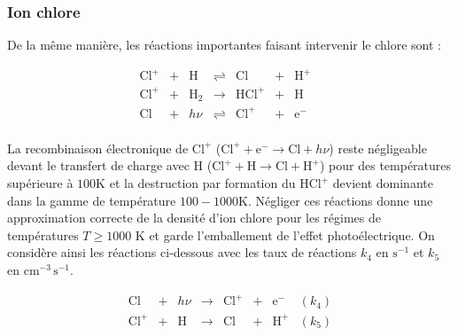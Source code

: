 


\subsubsection{Ion chlore}

De la même manière, les réactions importantes faisant intervenir le chlore sont :

\begin{equation}\label{eq:sysCl}
    \begin{array}{lllllllr}
        \mathrm{Cl}^+ & + &\mathrm{H}   & \rightleftharpoons &\mathrm{Cl}  & + & \mathrm{H}^+ &   \\
        \mathrm{Cl}^+ & + &\mathrm{H_2}   & \rightarrow & \mathrm{HCl}^+ & + &  \mathrm{H}&  \\
       \mathrm{Cl}  & + & h\nu & \rightleftharpoons & \mathrm{Cl}^+ & + & \mathrm{e}^- &  \\
    \end{array}
\end{equation}


La recombinaison électronique de $\mathrm{Cl}^+$ ($\mathrm{Cl}^+ + \mathrm{e}^-\rightarrow  \mathrm{Cl} + h\nu $) reste négligeable devant le transfert de charge avec $\mathrm{H}$  ($\mathrm{Cl}^+ + \mathrm{H} \rightarrow \mathrm{Cl}+ \mathrm{H}^+ $) pour des températures supérieure à $100$K et la destruction par formation du $\mathrm{HCl}^+$ devient dominante dans la gamme de température $100-1000$K. Négliger ces réactions donne une approximation correcte de la densité d'ion chlore pour les régimes de températures $T\geq 1000$ K et garde l'emballement de l'effet photoélectrique. On considère ainsi les réactions ci-dessous avec les taux de réactions $k_4$ en $\mathrm{s}^{-1}$ et $k_5$ en $\mathrm{cm}^{-3}\,\mathrm{s}^{-1}$.

\begin{equation}
    \begin{array}{lccccclr}
       \mathrm{Cl}  & + & h\nu & \rightarrow & \mathrm{Cl}^+ & + & \mathrm{e}^- & (k_4) \\
        \mathrm{Cl}^+ & + &\mathrm{H}   & \rightarrow &\mathrm{Cl}  & + & \mathrm{H}^+ & (k_5) \\
    \end{array}
\end{equation}

